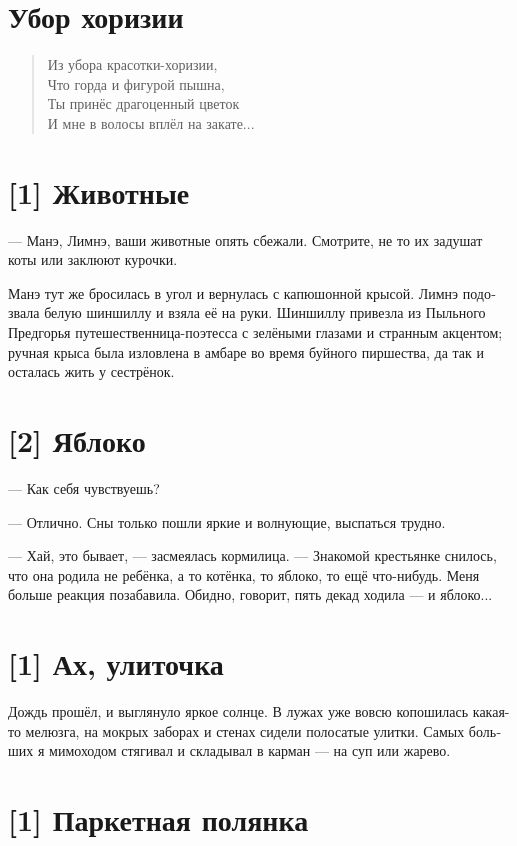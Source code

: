 \documentclass[a4paper,12pt,fleqn]{book}\usepackage{polyglossia}\setdefaultlanguage[babelshorthands=true]{russian}\setotherlanguage{english}\defaultfontfeatures{Ligatures=TeX,Mapping=tex-text}\usepackage{xcolor}\newcommand{\ml}[3]{#2}
\begin{document}
{\section{Убор хоризии}

\begin{verse}
Из убора красотки-хоризии,\\
Что горда и фигурой пышна,\\
Ты принёс драгоценный цветок\\
И мне в волосы вплёл на закате...
\end{verse}

\section{[1] Животные}

--- Манэ, Лимнэ, ваши животные опять сбежали.
Смотрите, не то их задушат коты или заклюют курочки.

Манэ тут же бросилась в угол и вернулась с капюшонной крысой.
Лимнэ подозвала белую шиншиллу и взяла её на руки.
Шиншиллу привезла из Пыльного Предгорья путешественница-поэтесса с зелёными глазами и странным акцентом;
ручная крыса была изловлена в амбаре во время буйного пиршества, да так и осталась жить у сестрёнок.

\section{[2] Яблоко}

--- Как себя чувствуешь?

--- Отлично.
Сны только пошли яркие и волнующие, выспаться трудно.

--- Хай, это бывает, --- засмеялась кормилица.
--- Знакомой крестьянке снилось, что она родила не ребёнка, а то котёнка, то яблоко, то ещё что-нибудь.
Меня больше реакция позабавила.
Обидно, говорит, пять декад ходила --- и яблоко...

\section{[1] Ах, улиточка}

Дождь прошёл, и выглянуло яркое солнце.
В лужах уже вовсю копошилась какая-то мелюзга, на мокрых заборах и стенах сидели полосатые улитки.
Самых больших я мимоходом стягивал и складывал в карман --- на суп или жарево.

\section{[1] Паркетная полянка}

}
\end{document}
